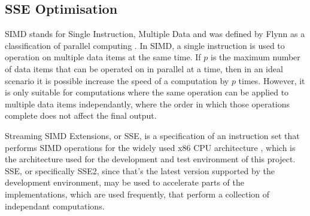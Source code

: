 \subsection{SSE Optimisation}

SIMD stands for Single Instruction, Multiple Data and was defined by Flynn as a classification of parallel computing \cite{flynns-taxonomy}. In SIMD, a single instruction is used to operation on multiple data items at the same time. If $p$ is the maximum number of data items that can be operated on in parallel at a time, then in an ideal scenario it is possible increase the speed of a computation by $p$ times. However, it is only suitable for computations where the same operation can be applied to multiple data items independantly, where the order in which those operations complete does not affect the final output.

Streaming SIMD Extensions, or SSE, is a specification of an instruction set that performs SIMD operations for the widely used x86 CPU architecture \cite{sse}, which is the architecture used for the development and test environment of this project. SSE, or specifically SSE2, since that's the latest version supported by the development environment, may be used to accelerate parts of the implementations, which are used frequently, that perform a collection of independant computations.
